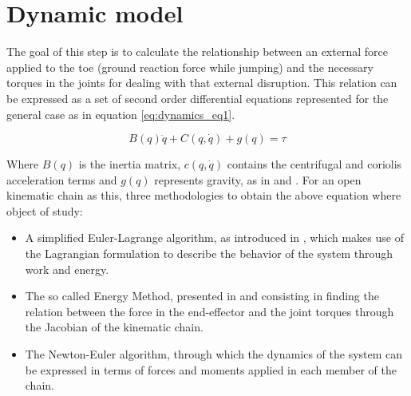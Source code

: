 \section{Dynamic model}
\label{sec_dynamic_model}
The goal of this step is to calculate the relationship between an external force applied to the toe (ground reaction force while jumping) and the necessary torques in the joints for dealing with that external disruption.
This relation can be expressed as a set of second order differential equations represented for the general case as in equation \ref{eq:dynamics_eq1}.

\begin{equation}
	\label{eq:dynamics_eq1}
	B(q)\ddot{q} + C(q,\dot{q}) + g(q) = \tau
\end{equation}

Where $B(q)$ is the inertia matrix, $c(q,\dot{q})$ contains the centrifugal and coriolis acceleration terms and $g(q)$ represents gravity, as in \cite{dynamics1} and \cite{dynamics2}. 
For an open kinematic chain as this, three methodologies to obtain the above equation where object of study:

\begin{itemize}
	\item A simplified Euler-Lagrange algorithm, as introduced in \cite{E-L1}, which makes use of the Lagrangian formulation to describe the behavior of the system through work and energy.
	\item The so called Energy Method, presented in \cite{asada} and consisting in finding the relation between the force in the end-effector and the joint torques through the Jacobian of the kinematic chain.
	\item The Newton-Euler algorithm, through which the dynamics of the system can be expressed in terms of forces and moments applied in each member of the chain.
\end{itemize}



